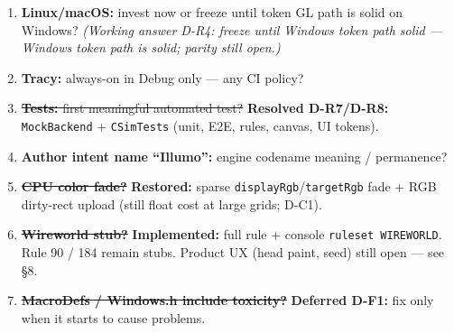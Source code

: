 \begin{openbox}
\begin{enumerate}
  \item \textbf{Linux/macOS:} invest now or freeze until token GL path is solid
        on Windows?
        \emph{(Working answer D-R4: freeze until Windows token path solid ---
        Windows token path is solid; parity still open.)}
  \item \textbf{Tracy:} always-on in Debug only --- any CI policy?
  \item \sout{\textbf{Tests:} first meaningful automated test?}
        \textbf{Resolved D-R7/D-R8:} \texttt{MockBackend} + \texttt{CSimTests}
        (unit, E2E, rules, canvas, UI tokens).
  \item \textbf{Author intent name ``Illumo'':} engine codename meaning /
        permanence?
  \item \sout{\textbf{CPU color fade?}}
        \textbf{Restored:} sparse \texttt{displayRgb}/\texttt{targetRgb} fade +
        RGB dirty-rect upload (still float cost at large grids; D-C1).
  \item \sout{\textbf{Wireworld stub?}}
        \textbf{Implemented:} full rule + console \texttt{ruleset WIREWORLD}.
        Rule 90 / 184 remain stubs. Product UX (head paint, seed) still open
        --- see  \S8.
  \item \sout{\textbf{MacroDefs / Windows.h include toxicity?}}
        \textbf{Deferred D-F1:} fix only when it starts to cause problems.
\end{enumerate}
\end{openbox}

